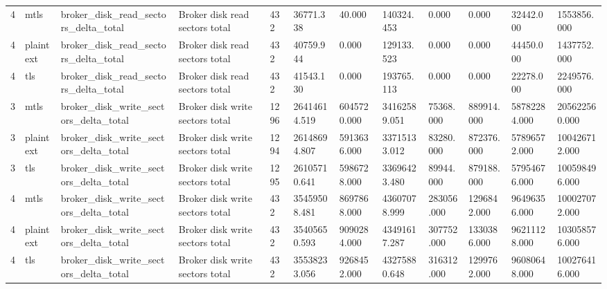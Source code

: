 \begin{longtable}{llllllllllll}
4 & mtls & broker\_disk\_read\_sectors\_delta\_total & Broker disk read sectors total & 432 & 36771.338 & 40.000 & 140324.453 & 0.000 & 0.000 & 32442.000 & 1553856.000 \\
4 & plaintext & broker\_disk\_read\_sectors\_delta\_total & Broker disk read sectors total & 432 & 40759.944 & 0.000 & 129133.523 & 0.000 & 0.000 & 44450.000 & 1437752.000 \\
4 & tls & broker\_disk\_read\_sectors\_delta\_total & Broker disk read sectors total & 432 & 41543.130 & 0.000 & 193765.113 & 0.000 & 0.000 & 22278.000 & 2249576.000 \\
3 & mtls & broker\_disk\_write\_sectors\_delta\_total & Broker disk write sectors total & 1296 & 26414614.519 & 6045720.000 & 34162589.051 & 75368.000 & 889914.000 & 58782284.000 & 205622560.000 \\
3 & plaintext & broker\_disk\_write\_sectors\_delta\_total & Broker disk write sectors total & 1294 & 26148694.807 & 5913636.000 & 33715133.012 & 83280.000 & 872376.000 & 57896572.000 & 100426712.000 \\
3 & tls & broker\_disk\_write\_sectors\_delta\_total & Broker disk write sectors total & 1295 & 26105710.641 & 5986728.000 & 33696423.480 & 89944.000 & 879188.000 & 57954676.000 & 100598496.000 \\
4 & mtls & broker\_disk\_write\_sectors\_delta\_total & Broker disk write sectors total & 432 & 35459508.481 & 8697868.000 & 43607078.999 & 283056.000 & 1296842.000 & 96496356.000 & 100027072.000 \\
4 & plaintext & broker\_disk\_write\_sectors\_delta\_total & Broker disk write sectors total & 432 & 35405650.593 & 9090284.000 & 43491617.287 & 307752.000 & 1330386.000 & 96211128.000 & 103058576.000 \\
4 & tls & broker\_disk\_write\_sectors\_delta\_total & Broker disk write sectors total & 432 & 35538233.056 & 9268452.000 & 43275880.648 & 316312.000 & 1299762.000 & 96080648.000 & 100276416.000 \\
\hline
\end{longtable}
